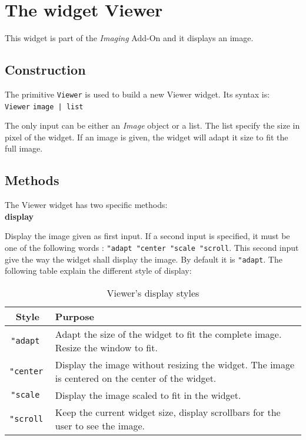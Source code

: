 \section{The widget Viewer}

\cbstart
This widget is part of the {\em Imaging} Add-On and it displays an image.

\subsection{Construction}

The primitive {\tt Viewer} is used to build a new Viewer widget. Its syntax is:\\

{\tt Viewer} {\tt image | list}

The only input can be either an {\it Image} object or a list. The list specify the size in pixel of the widget. If an image is given, the widget will adapt it
size to fit the full image.

\subsection{Methods}

The Viewer widget has two specific methods:\\

{\bf display} 
Display the image given as first input. If a second input is specified, it must be one of the following words : {\tt "adapt "center "scale "scroll}. This second input give the way the widget shall display the image. By default it is {\tt "adapt}. The following table explain the different style of display:\\

\begin{table}[h!]
\centering
\begin{tabular}{|c|p{6cm}|}
\hline
\bf Style & \bf Purpose \\
\hline
\tt "adapt\index{Viewer@\textbf{Viewer}!Style!adapt} &  Adapt the size of the widget to fit the complete image. Resize the window to fit.\\
\hline
\tt "center\index{Viewer@\textbf{Viewer}!Style!center} & Display the image without resizing the widget. The image is centered on the center of the widget.\\
\hline
\tt "scale\index{Viewer@\textbf{Viewer}!Style!scale} &  Display the image scaled to fit in the widget.\\
\hline
\tt "scroll\index{Viewer@\textbf{Viewer}!Style!scroll} &  Keep the current widget size, display scrollbars for the user to see the image.\\
\hline
\end{tabular}
\caption{Viewer's display styles}
\end{table}

